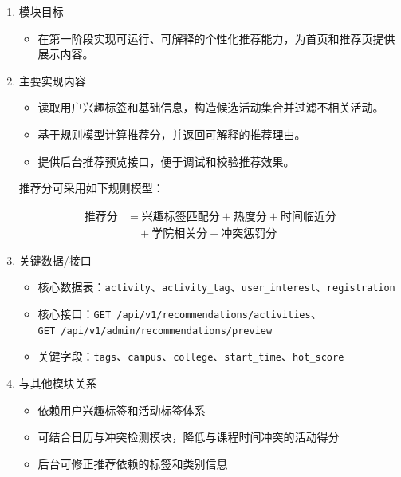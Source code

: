 \documentclass[UTF8,a4paper,12pt,fontset=none]{ctexrep}
\providecommand{\tightlist}{}
\begin{document}
\begin{enumerate}
\def\labelenumi{\arabic{enumi}.}
\item
  模块目标

  \begin{itemize}
  \tightlist
  \item
    在第一阶段实现可运行、可解释的个性化推荐能力，为首页和推荐页提供展示内容。
  \end{itemize}
\item
  主要实现内容

  \begin{itemize}
  \tightlist
  \item
    读取用户兴趣标签和基础信息，构造候选活动集合并过滤不相关活动。
  \item
    基于规则模型计算推荐分，并返回可解释的推荐理由。
  \item
    提供后台推荐预览接口，便于调试和校验推荐效果。
  \end{itemize}

  推荐分可采用如下规则模型：

\[
\begin{aligned}
\text{推荐分} &= \text{兴趣标签匹配分} + \text{热度分} + \text{时间临近分} \\
&\quad + \text{学院相关分} - \text{冲突惩罚分}
\end{aligned}
\]
\item
  关键数据/接口

  \begin{itemize}
  \tightlist
  \item
    核心数据表：\texttt{activity}、\texttt{activity\_tag}、\texttt{user\_interest}、\texttt{registration}
  \item
    核心接口：\texttt{GET\ /api/v1/recommendations/activities}、\\
    \texttt{GET\ /api/v1/admin/recommendations/preview}
  \item
    关键字段：\texttt{tags}、\texttt{campus}、\texttt{college}、\texttt{start\_time}、\texttt{hot\_score}
  \end{itemize}
\item
  与其他模块关系

  \begin{itemize}
  \tightlist
  \item
    依赖用户兴趣标签和活动标签体系
  \item
    可结合日历与冲突检测模块，降低与课程时间冲突的活动得分
  \item
    后台可修正推荐依赖的标签和类别信息
  \end{itemize}
\end{enumerate}
\end{document}
